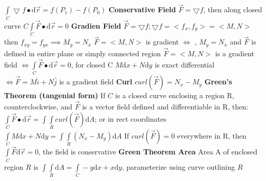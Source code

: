 \documentclass[twoside]{article}
\begin{document}
\indent\indent
$\int\limits_C \bigtriangledown f \bullet \mathrm{d}\vec{r}= f(P_{1})-f(P_{0})$\newline\newline
\indent
\textbf{Conservative Field}\newline\newline
\indent\indent
$\vec{F} = \bigtriangledown f$, then along closed curve $C \int\limits_C \vec{F} \bullet \mathrm{d}\vec{r} = 0$\newline\newline
\indent
\textbf{Gradien Field}\newline\newline
\indent\indent
$\vec{F} = \bigtriangledown f; \bigtriangledown f = <f_{x},f_{y}> = <M,N>$ then $f_{xy}=f_{yx} \implies M_{y}=N_{x}$\newline
\indent\indent
$\vec{F}=<M,N>$ is gradient $\iff$ , $M_{y}=N_{x}$ and $\vec{F}$ is defined in entire plane or simply connected region\newline
\indent\indent
$\vec{F} = <M,N>$ is a gradient field $\iff \int\limits_C\vec{F}\bullet\mathrm{d}\vec{r} = 0$, for closed C\newline
\indent\indent
$M\mathrm{d}x+N\mathrm{d}y$ is exact differential $\iff \vec{F}=M\hat{i}+N\hat{j}$ is a gradient field\newline
\indent
\textbf{Curl}\newline
\indent\indent
$curl(\vec{F}) = N_{x}-M_{y}$\newline
\indent
\textbf{Green's Theorem (tangenial form)}\newline
\indent\indent
If $C$ is a closed curve enclosing a region R, counterclockwise, and $\vec{F}$ is a vector field defined and differentiable in R,\newline
\indent\indent then: $\int\limits_C \vec{F} \bullet \mathrm{d}\vec{r} = \int\int\limits_R curl(\vec{F}) \mathrm{d}A$; or in rect coordinates $\int\limits_C M\mathrm{d}x + N\mathrm{d}y = \int\int\limits_R(N_{x}-M_{y})\mathrm{d}A$\newline
\indent\indent
If $curl(\vec{F}) = 0$ everywhere in R, then $\int\limits_C \vec{F} \mathrm{d}\vec{r} = 0$, the field is conservative\newline\newline
\indent
\textbf{Green Theorem Area}\newline
\indent\indent
Area A of enclosed region $R$ is $\int\int\limits_R \mathrm{d}A = \int\limits_C -y\mathrm{d}x +x\mathrm{d}y$, parameterize using curve outlining $R$\newline\newline
\end{document}
